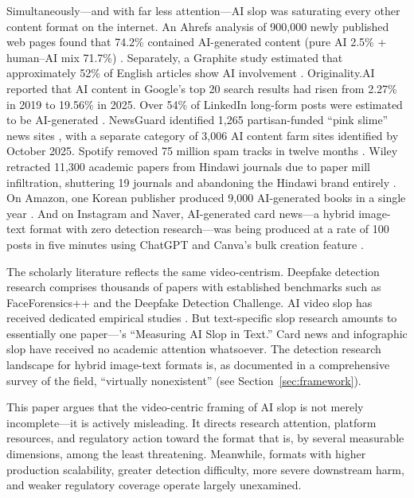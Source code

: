 \documentclass[12pt,a4paper]{article}
\begin{document}
Simultaneously---and with far less attention---AI slop was saturating every other content format on the internet. An Ahrefs analysis of 900,000 newly published web pages found that 74.2\% contained AI-generated content (pure AI 2.5\% + human--AI mix 71.7\%) \parencite{Ahrefs2025}. Separately, a Graphite study estimated that approximately 52\% of English articles show AI involvement \parencite{Graphite2025}. Originality.AI reported that AI content in Google's top 20 search results had risen from 2.27\% in 2019 to 19.56\% in 2025. Over 54\% of LinkedIn long-form posts were estimated to be AI-generated \parencite{OriginalityAI2025a}. NewsGuard identified 1,265 partisan-funded ``pink slime'' news sites \parencite{NewsGuard2024}, with a separate category of 3,006 AI content farm sites identified by October 2025. Spotify removed 75 million spam tracks in twelve months \parencite{NME2025}. Wiley retracted 11,300 academic papers from Hindawi journals due to paper mill infiltration, shuttering 19 journals and abandoning the Hindawi brand entirely \parencite{TheRegister2024}. On Amazon, one Korean publisher produced 9,000 AI-generated books in a single year \parencite{KoreaTimes2025}. And on Instagram and Naver, AI-generated card news---a hybrid image-text format with zero detection research---was being produced at a rate of 100 posts in five minutes using ChatGPT and Canva's bulk creation feature \parencite{Lee2025}.

The scholarly literature reflects the same video-centrism. Deepfake detection research comprises thousands of papers with established benchmarks such as FaceForensics++ and the Deepfake Detection Challenge. AI video slop has received dedicated empirical studies \parencite{Jones2025,Kapwing2025}. But text-specific slop research amounts to essentially one paper---\textcite{Shaib2025}'s ``Measuring AI Slop in Text.'' Card news and infographic slop have received no academic attention whatsoever. The detection research landscape for hybrid image-text formats is, as documented in a comprehensive survey of the field, ``virtually nonexistent'' (see Section~\ref{sec:framework}).

This paper argues that the video-centric framing of AI slop is not merely incomplete---it is actively misleading. It directs research attention, platform resources, and regulatory action toward the format that is, by several measurable dimensions, among the least threatening. Meanwhile, formats with higher production scalability, greater detection difficulty, more severe downstream harm, and weaker regulatory coverage operate largely unexamined.
\end{document}
